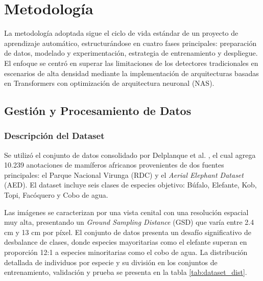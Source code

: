\section{Metodología}

La metodología adoptada sigue el ciclo de vida estándar de un proyecto de aprendizaje automático, estructurándose en cuatro fases principales: preparación de datos, modelado y experimentación, estrategia de entrenamiento y despliegue. El enfoque se centró en superar las limitaciones de los detectores tradicionales en escenarios de alta densidad mediante la implementación de arquitecturas basadas en Transformers con optimización de arquitectura neuronal (NAS).

\subsection{Gestión y Procesamiento de Datos}

\subsubsection{Descripción del Dataset}
Se utilizó el conjunto de datos consolidado por Delplanque et al. \cite{delplanque-data}, el cual agrega 10.239 anotaciones de mamíferos africanos provenientes de dos fuentes principales: el Parque Nacional Virunga (RDC) y el \textit{Aerial Elephant Dataset} (AED). El dataset incluye seis clases de especies objetivo: Búfalo, Elefante, Kob, Topi, Facóquero y Cobo de agua.

Las imágenes se caracterizan por una vista cenital con una resolución espacial muy alta, presentando un \textit{Ground Sampling Distance} (GSD) que varía entre 2.4 cm y 13 cm por píxel. El conjunto de datos presenta un desafío significativo de desbalance de clases, donde especies mayoritarias como el elefante superan en proporción 12:1 a especies minoritarias como el cobo de agua. La distribución detallada de individuos por especie y su división en los conjuntos de entrenamiento, validación y prueba se presenta en la tabla \ref{tab:dataset_dist}.

